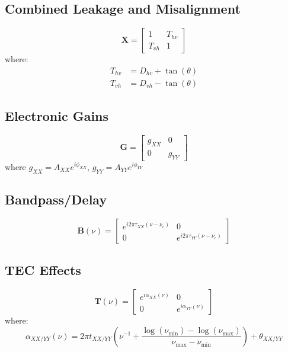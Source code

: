 \documentclass{aastex631}
\begin{document}
\subsection{Combined Leakage and Misalignment}
\begin{equation}
\mathbf{X} = \begin{bmatrix} 1 & T_{hv} \\ T_{vh} & 1 \end{bmatrix}
\end{equation}
where:
\begin{align}
T_{hv} &= D_{hv} + \tan(\theta) \\
T_{vh} &= D_{vh} - \tan(\theta)
\end{align}

\subsection{Electronic Gains}
\begin{equation}
\mathbf{G} = \begin{bmatrix} g_{XX} & 0 \\ 0 & g_{YY} \end{bmatrix}
\end{equation}
where $g_{XX} = A_{XX} e^{i\phi_{XX}}$, $g_{YY} = A_{YY} e^{i\phi_{YY}}$

\subsection{Bandpass/Delay}
\begin{equation}
\mathbf{B}(\nu) = \begin{bmatrix} 
e^{i 2\pi \tau_{XX}(\nu - \nu_c)} & 0 \\ 
0 & e^{i 2\pi \tau_{YY}(\nu - \nu_c)} 
\end{bmatrix}
\end{equation}

\subsection{TEC Effects}
\begin{equation}
\mathbf{T}(\nu) = \begin{bmatrix} 
e^{i \alpha_{XX}(\nu)} & 0 \\ 
0 & e^{i \alpha_{YY}(\nu)} 
\end{bmatrix}
\end{equation}
where:
\begin{equation}
\alpha_{XX/YY}(\nu) = 2\pi t_{XX/YY}\left(\nu^{-1} + \frac{\log(\nu_{\min}) - \log(\nu_{\max})}{\nu_{\max} - \nu_{\min}}\right) + \theta_{XX/YY}
\end{equation}
\end{document}
